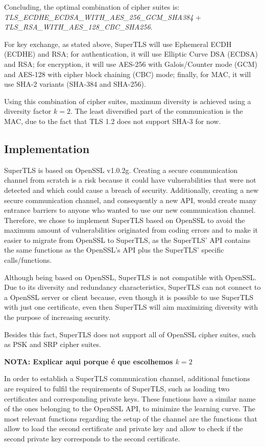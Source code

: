 \documentclass{sig-alternate-05-2015}
\begin{document}
Concluding, the optimal combination of cipher suites is:\\
\textit{TLS\_ECDHE\_ECDSA\_WITH\_AES\_256\_GCM\_SHA384} + \\\textit{TLS\_RSA\_WITH\_AES\_128\_CBC\_SHA256}.

For key exchange, as stated above, SuperTLS will use Ephemeral ECDH (ECDHE) and RSA; for authentication, it will use Elliptic Curve DSA (ECDSA) and RSA; for encryption, it will use AES-256 with Galois/Counter mode (GCM) and AES-128 with cipher block chaining (CBC) mode; finally, for MAC, it will use SHA-2 variants (SHA-384 and SHA-256).

Using this combination of cipher suites, maximum diversity is achieved using a diversity factor $k = 2$. The least diversified part of the communication is the MAC, due to the fact that TLS 1.2 does not support SHA-3 for now.

\subsection{Implementation}

SuperTLS is based on OpenSSL v1.0.2g. Creating a secure communication channel from scratch is a risk because it could have vulnerabilities that were not detected and which could cause a breach of security. Additionally, creating a new secure communication channel, and consequently a new API, would create many entrance barriers to anyone who wanted to use our new communication channel. Therefore, we chose to implement SuperTLS based on OpenSSL to avoid the maximum amount of vulnerabilities originated from coding errors and to make it easier to migrate from OpenSSL to SuperTLS, as the SuperTLS' API contains the same functions as the OpenSSL's API plus the SuperTLS' specific calls/functions.

Although being based on OpenSSL, SuperTLS is not compatible with OpenSSL. Due to its diversity and redundancy characteristics, SuperTLS can not connect to a OpenSSL server or client because, even though it is possible to use SuperTLS with just one certificate, even then SuperTLS will aim maximizing diversity with the purpose of increasing security.

Besides this fact, SuperTLS does not support all of OpenSSL cipher suites, such as PSK and SRP cipher suites.

\textbf{NOTA: Explicar aqui porque \'e que escolhemos $k = 2$}

In order to establish a SuperTLS communication channel, additional functions are required to fulfil the requirements of SuperTLS, such as loading two certificates and corresponding private keys. These functions have a similar name of the ones belonging to the OpenSSL API, to minimize the learning curve.
The most relevant functions regarding the setup of the channel are the functions that allow to load the second certificate and private key and allow to check if the second private key corresponds to the second certificate.
\end{document}
